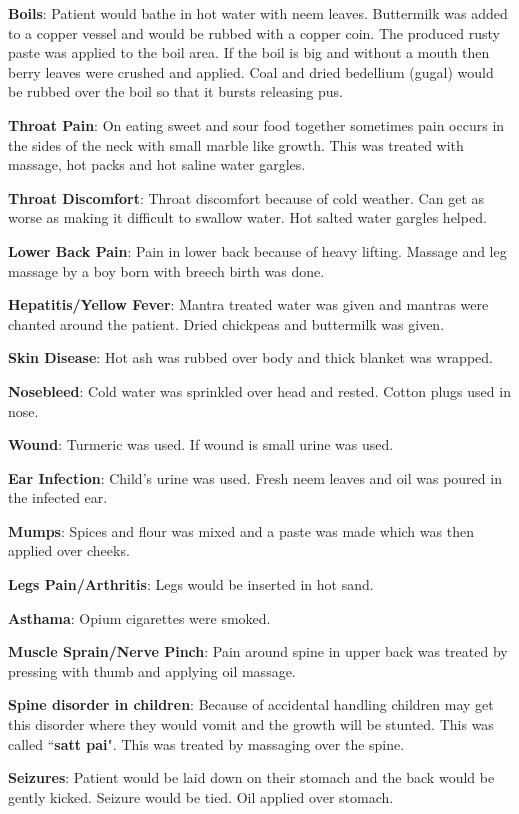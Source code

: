 \textbf{Boils}: Patient would bathe in hot water with neem leaves. Buttermilk
was added to a copper vessel and would be rubbed with a copper coin. The
produced rusty paste was applied to the boil area. If the boil is big and
without a mouth then berry leaves were crushed and applied. Coal and dried
bedellium (gugal) would be rubbed over the boil so that it bursts releasing pus.

\textbf{Throat Pain}: On eating sweet and sour food together sometimes pain
occurs in the sides of the neck with small marble like growth. This was treated
with massage, hot packs and hot saline water gargles.

\textbf{Throat Discomfort}: Throat discomfort because of cold weather. Can get
as worse as making it difficult to swallow water. Hot salted water gargles
helped.

\textbf{Lower Back Pain}: Pain in lower back because of heavy lifting. Massage
and leg massage by a boy born with breech birth was done.

\textbf{Hepatitis/Yellow Fever}: Mantra treated water was given and mantras
were chanted around the patient. Dried chickpeas and buttermilk was given.

\textbf{Skin Disease}: Hot ash was rubbed over body and thick blanket was
wrapped.

\textbf{Nosebleed}: Cold water was sprinkled over head and rested. Cotton plugs
used in nose.

\textbf{Wound}: Turmeric was used. If wound is small urine was used.

\textbf{Ear Infection}: Child's urine was used. Fresh neem leaves and oil was
poured in the infected ear.

\textbf{Mumps}: Spices and flour was mixed and a paste was made which was then
applied over cheeks.

\textbf{Legs Pain/Arthritis}: Legs would be inserted in hot sand.

\textbf{Asthama}: Opium cigarettes were smoked.

\textbf{Muscle Sprain/Nerve Pinch}: Pain around spine in upper back was treated
by pressing with thumb and applying oil massage. 

\textbf{Spine disorder in children}: Because of accidental handling children
may get this disorder where they would vomit and the growth will be stunted.
This was called ``\textbf{satt pai}". This was treated by massaging over the
spine.

\textbf{Seizures}: Patient would be laid down on their stomach and the back
would be gently kicked. Seizure would be tied. Oil applied over stomach. 

